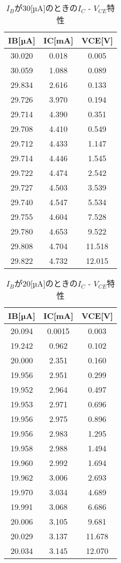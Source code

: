 \documentclass[a4j,10pt,dvipdfmx]{jarticle}
\begin{document}
\begin{table}[H]
\label{2}
\begin{center}
\caption{$I_B$が30[µA]のときの$I_C$ - $V_{CE}$特性}
\begin{tabular}{ccc} \\
\hline
IB[µA] & IC[mA] & VCE[V] \\ \hline
30.020  & 0.018  & 0.005  \\
30.059  & 1.088  & 0.089  \\
29.834  & 2.616  & 0.133  \\
29.726  & 3.970  & 0.194  \\
29.714  & 4.390  & 0.351  \\
29.708  & 4.410  & 0.549  \\
29.712  & 4.433  & 1.147  \\
29.714  & 4.446  & 1.545  \\
29.722  & 4.474  & 2.542  \\
29.727  & 4.503  & 3.539  \\
29.740  & 4.547  & 5.534  \\
29.755  & 4.604  & 7.528  \\
29.780  & 4.653  & 9.522  \\
29.808  & 4.704  & 11.518  \\
29.822  & 4.732  & 12.015  \\ \hline
\end{tabular}
\end{center}
\end{table}
\begin{table}[H]
\label{3}
\begin{center}
\caption{$I_B$が20[µA]のときの$I_C$ - $V_{CE}$特性}
\begin{tabular}{ccc} \\
\hline
IB[µA] & IC[mA] & VCE[V] \\ \hline
20.094  & 0.0015 & 0.003 \\
19.242  & 0.962  & 0.102  \\
20.000  & 2.351  & 0.160  \\
19.956  & 2.951  & 0.299  \\
19.952  & 2.964  & 0.497  \\
19.953  & 2.971  & 0.696  \\
19.956  & 2.975  & 0.896  \\
19.956  & 2.983  & 1.295  \\
19.958  & 2.988  & 1.494  \\
19.960  & 2.992  & 1.694  \\
19.962  & 3.006  & 2.693  \\
19.970  & 3.034  & 4.689  \\
19.991  & 3.068  & 6.686  \\
20.006  & 3.105  & 9.681  \\
20.029  & 3.137  & 11.678  \\
20.034  & 3.145  & 12.070  \\ \hline
\end{tabular}
\end{center}
\end{table}
\end{document}
